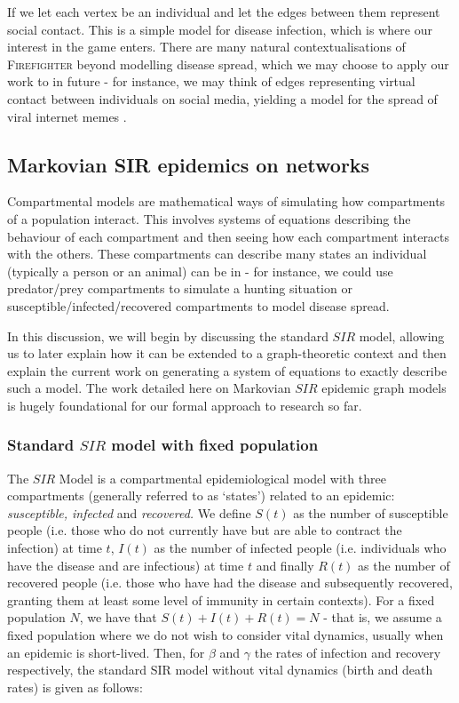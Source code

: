 \documentclass[../report.tex]{subfiles}
\begin{document}
If we let each vertex be an individual and let the edges between them represent social contact. This is a simple model for disease infection, which is where our interest in the game enters. There are many natural contextualisations of {\scshape Firefighter} beyond modelling disease spread, which we may choose to apply our work to in future - for instance, we may think of edges representing virtual contact between individuals on social media, yielding a model for the spread of viral internet memes \cite{obrien_2019}.


\subsection{Markovian SIR epidemics on networks}
\label{subsec:SIR-lit}

Compartmental models are mathematical ways of simulating how compartments of a population interact. This involves systems of equations describing the behaviour of each compartment and then seeing how each compartment interacts with the others. These compartments can describe many states an individual (typically a person or an animal) can be in - for instance, we could use predator/prey compartments to simulate a hunting situation or susceptible/infected/recovered compartments to model disease spread. 

In this discussion, we will begin by discussing the standard $SIR$ model, allowing us to later explain how it can be extended to a graph-theoretic context and then explain the current work on generating a system of equations to exactly describe such a model. The work detailed here on Markovian $SIR$ epidemic graph models is hugely foundational for our formal approach to research so far.

\subsubsection{Standard $SIR$ model with fixed population}

The $SIR$ Model is a compartmental epidemiological model with three compartments (generally referred to as `states') related to an epidemic: {\it susceptible, infected} and {\it recovered.} We define $S(t)$ as the number of susceptible people (i.e. those who do not currently have but are able to contract the infection) at time $t$, $I(t)$ as the number of infected people (i.e. individuals who have the disease and are infectious) at time $t$ and finally $R(t)$ as the number of recovered people (i.e. those who have had the disease and subsequently recovered, granting them at least some level of immunity in certain contexts). For a fixed population $N$, we have that $S(t) + I(t) + R(t) = N$ - that is, we assume a fixed population where we do not wish to consider vital dynamics, usually when an epidemic is short-lived. Then, for $\beta$ and $\gamma$ the rates of infection and recovery respectively, the standard SIR model without vital dynamics (birth and death rates) is given as follows:
\end{document}
